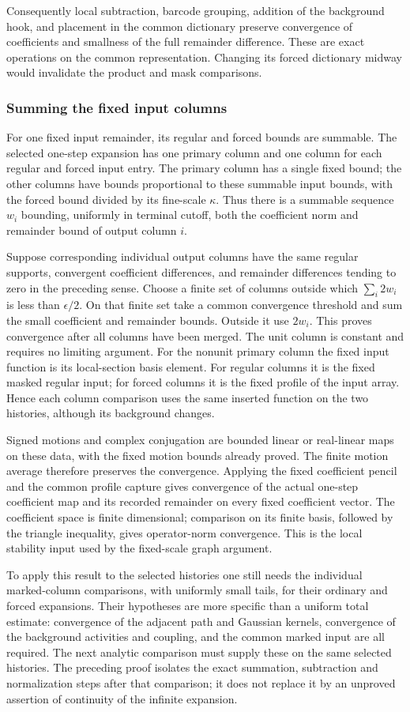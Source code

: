 Consequently local subtraction, barcode grouping, addition of
the background hook, and placement in the common dictionary
preserve convergence of coefficients and smallness of the full
remainder difference. These are exact operations on the common
representation. Changing its forced dictionary midway would
invalidate the product and mask comparisons.

\subsubsection{Summing the fixed input columns}
For one fixed input remainder, its regular and forced bounds
are summable. The selected one-step expansion has one primary
column and one column for each regular and forced input entry.
The primary column has a single fixed bound; the other columns
have bounds proportional to these summable input bounds, with
the forced bound divided by its fine-scale $\kappa$.
Thus there is a summable sequence $w_i$ bounding, uniformly in
terminal cutoff, both the coefficient norm and remainder bound
of output column $i$.

Suppose corresponding individual output columns have the same
regular supports, convergent coefficient differences, and
remainder differences tending to zero in the preceding sense.
Choose a finite set of columns outside which $\sum_i2w_i$
is less than $\epsilon/2$. On that finite set take a common
convergence threshold and sum the small coefficient and remainder
bounds. Outside it use $2w_i$. This proves convergence after
all columns have been merged. The unit column is constant and
requires no limiting argument. For the nonunit primary column
the fixed input function is its local-section basis element.
For regular columns it is the fixed masked regular input; for
forced columns it is the fixed profile of the input array.
Hence each column comparison uses the same inserted function
on the two histories, although its background changes.

Signed motions and complex conjugation are bounded linear or
real-linear maps on these data, with the fixed motion bounds
already proved. The finite motion average therefore preserves
the convergence. Applying the fixed coefficient pencil and
the common profile capture gives convergence of the actual
one-step coefficient map and its recorded remainder on every
fixed coefficient vector. The coefficient space is finite
dimensional; comparison on its finite basis, followed by the
triangle inequality, gives operator-norm convergence. This is
the local stability input used by the fixed-scale graph argument.

To apply this result to the selected histories one still needs
the individual marked-column comparisons, with uniformly small
tails, for their ordinary and forced expansions. Their hypotheses
are more specific than a uniform total estimate: convergence
of the adjacent path and Gaussian kernels, convergence of the
background activities and coupling, and the common marked input
are all required. The next analytic comparison must supply these
on the same selected histories. The preceding proof isolates
the exact summation, subtraction and normalization steps after
that comparison; it does not replace it by an unproved assertion
of continuity of the infinite expansion.
